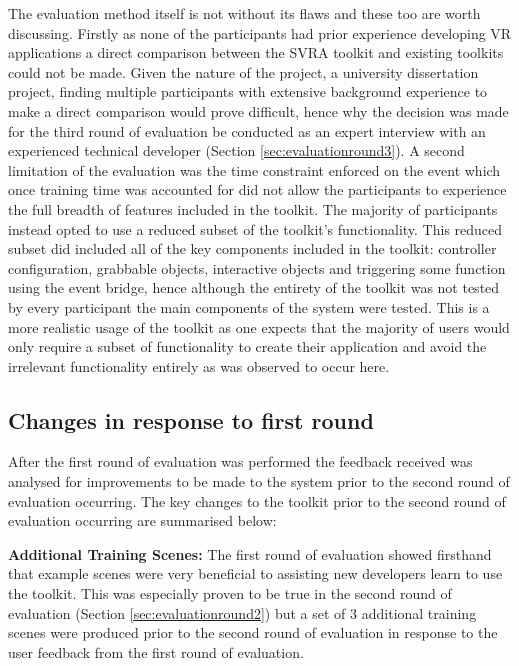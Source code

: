 \documentclass{l4proj}
\begin{document}
The evaluation method itself is not without its flaws and these too are worth discussing. Firstly as none of the participants had prior experience developing VR applications a direct comparison between the SVRA toolkit and existing toolkits could not be made. Given the nature of the project, a university dissertation project, finding multiple participants with extensive background experience to make a direct comparison would prove difficult, hence why the decision was made for the third round of evaluation be conducted as an expert interview with an experienced technical developer (Section \ref{sec:evaluationround3}). A second limitation of the evaluation was the time constraint enforced on the event which once training time was accounted for did not allow the participants to experience the full breadth of features included in the toolkit. The majority of participants instead opted to use a reduced subset of the toolkit's functionality. This reduced subset did included all of the key components included in the toolkit: controller configuration, grabbable objects, interactive objects and triggering some function using the event bridge, hence although the entirety of the toolkit was not tested by every participant the main components of the system were tested. This is a more realistic usage of the toolkit as one expects that the majority of users would only require a subset of functionality to create their application and avoid the irrelevant functionality entirely as was observed to occur here.

\subsection{Changes in response to first round}
\label{subsec:evlauationchanges1}
After the first round of evaluation was performed the feedback received was analysed for improvements to be made to the system prior to the second round of evaluation occurring. The key changes to the toolkit prior to the second round of evaluation occurring are summarised below:

\textbf{Additional Training Scenes:} The first round of evaluation showed firsthand that example scenes were very beneficial to assisting new developers learn to use the toolkit. This was especially proven to be true in the second round of evaluation (Section \ref{sec:evaluationround2}) but a set of 3 additional training scenes were produced prior to the second round of evaluation in response to the user feedback from the first round of evaluation.
\end{document}
